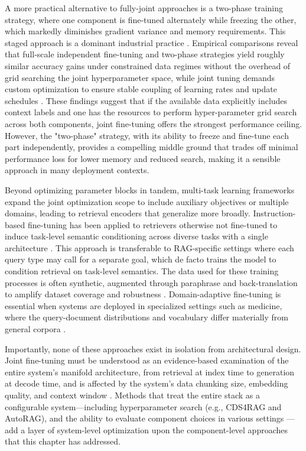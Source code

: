 \documentclass[11pt,a4paper]{article}
\begin{document}
A more practical alternative to fully-joint approaches is a two-phase training strategy, where one component is fine-tuned alternately while freezing the other, which markedly diminishes gradient variance and memory requirements. This staged approach is a dominant industrial practice \cite{arxiv:2602.03368v2}. Empirical comparisons reveal that full-scale independent fine-tuning and two-phase strategies yield roughly similar accuracy gains under constrained data regimes without the overhead of grid searching the joint hyperparameter space, while joint tuning demands custom optimization to ensure stable coupling of learning rates and update schedules \cite{arxiv:2510.01600v2}. These findings suggest that if the available data explicitly includes context labels and one has the resources to perform hyper-parameter grid search across both components, joint fine-tuning offers the strongest performance ceiling. However, the "two-phase" strategy, with its ability to freeze and fine-tune each part independently, provides a compelling middle ground that trades off minimal performance loss for lower memory and reduced search, making it a sensible approach in many deployment contexts.

Beyond optimizing parameter blocks in tandem, multi-task learning frameworks expand the joint optimization scope to include auxiliary objectives or multiple domains, leading to retrieval encoders that generalize more broadly. Instruction-based fine-tuning has been applied to retrievers otherwise not fine-tuned to induce task-level semantic conditioning across diverse tasks with a single architecture \cite{arxiv:2407.01219v1}. This approach is transferable to RAG-specific settings where each query type may call for a separate goal, which de facto trains the model to condition retrieval on task-level semantics. The data used for these training processes is often synthetic, augmented through paraphrase and back-translation to amplify dataset coverage and robustness \cite{arxiv:2508.06401v3}. Domain-adaptive fine-tuning is essential when systems are deployed in specialized settings such as medicine, where the query-document distributions and vocabulary differ materially from general corpora \cite{arxiv:2406.12449v1}.

Importantly, none of these approaches exist in isolation from architectural design. Joint fine-tuning must be understood as an evidence-based examination of the entire system's manifold architecture, from retrieval at index time to generation at decode time, and is affected by the system's data chunking size, embedding quality, and context window \cite{arxiv:2312.10997v5}. Methods that treat the entire stack as a configurable system---including hyperparameter search (e.g., CDS4RAG and AutoRAG), and the ability to evaluate component choices in various settings \cite{arxiv:2605.08333v1,arxiv:2410.20878v1,arxiv:2412.15529v4} --- add a layer of system-level optimization upon the component-level approaches that this chapter has addressed.
\end{document}
